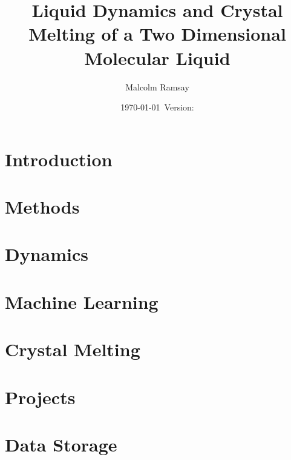 \documentclass[12pt, a4paper]{report}
\title{Liquid Dynamics and Crystal Melting of a Two Dimensional Molecular Liquid}
\author{Malcolm Ramsay}
\date{\today{}~Version: \version}
\begin{document}
\beforepreface{}
\afterpreface{}

\chapter{Introduction} \label{sec:Introduction}






\chapter{Methods} \label{sec:Methods}







\chapter{Dynamics} \label{sec:Dynamics}




\chapter{Machine Learning} \label{sec:Machine_Learning}



\chapter{Crystal Melting} \label{sec:Crystal_Melting}



\printbibliography{}

\begin{appendices}
  \chapter{Projects}
  

  \chapter{Data Storage}
  

\end{appendices}
\end{document}

